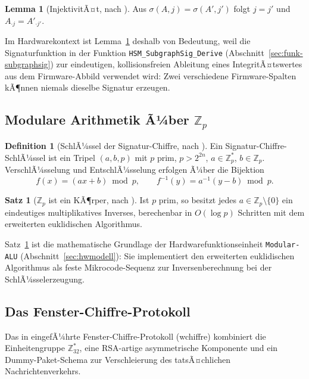 ﻿\documentclass[a4paper,12pt]{article}
\theoremstyle{definition}
\newtheorem{definition}{Definition}
\newtheorem{satz}{Satz}
\newtheorem{lemma}{Lemma}
\begin{document}
\begin{lemma}[InjektivitÃ¤t, nach \cite{Epp26a,Epp26b}]
	\label{lem:inj}
	Aus $\sigma(A,j) = \sigma(A',j')$ folgt $j=j'$ und $A_{\cdot j} = A'_{\cdot j'}$.
\end{lemma}

Im Hardwarekontext ist Lemma~\ref{lem:inj} deshalb von Bedeutung, weil die Signaturfunktion in der Funktion \texttt{HSM\_SubgraphSig\_Derive} (Abschnitt~\ref{sec:funk-subgraphsig}) zur eindeutigen, kollisionsfreien Ableitung eines IntegritÃ¤tswertes aus dem Firmware-Abbild verwendet wird: Zwei verschiedene Firmware-Spalten kÃ¶nnen niemals dieselbe Signatur erzeugen.

\subsection{Modulare Arithmetik Ã¼ber $\mathbb{Z}_p$}

\begin{definition}[SchlÃ¼ssel der Signatur-Chiffre, nach \cite{Epp26b}]
	\label{def:schluessel}
	Ein Signatur-Chiffre-SchlÃ¼ssel ist ein Tripel $(a,b,p)$ mit $p$ prim, $p > 2^{2n}$, $a \in \mathbb{Z}_p^*$, $b \in \mathbb{Z}_p$. VerschlÃ¼sselung und EntschlÃ¼sselung erfolgen Ã¼ber die Bijektion
	\[
	f(x) = (ax+b) \bmod p, \qquad f^{-1}(y) = a^{-1}(y-b) \bmod p.
	\]
\end{definition}

\begin{satz}[$\mathbb{Z}_p$ ist ein KÃ¶rper, nach \cite{Epp26b}]
	\label{satz:koerper}
	Ist $p$ prim, so besitzt jedes $a \in \mathbb{Z}_p \setminus \{0\}$ ein eindeutiges multiplikatives Inverses, berechenbar in $O(\log p)$ Schritten mit dem erweiterten euklidischen Algorithmus.
\end{satz}

Satz~\ref{satz:koerper} ist die mathematische Grundlage der Hardwarefunktionseinheit \texttt{Modular-ALU} (Abschnitt~\ref{sec:hwmodell}): Sie implementiert den erweiterten euklidischen Algorithmus als feste Mikrocode-Sequenz zur Inversenberechnung bei der SchlÃ¼sselerzeugung.

\subsection{Das Fenster-Chiffre-Protokoll}

Das in \cite{Epp26c} eingefÃ¼hrte Fenster-Chiffre-Protokoll (wchiffre) kombiniert die Einheitengruppe $\mathbb{Z}_{32}^*$, eine RSA-artige asymmetrische Komponente und ein Dummy-Paket-Schema zur Verschleierung des tatsÃ¤chlichen Nachrichtenverkehrs.
\end{document}
